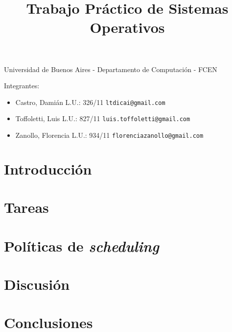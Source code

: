 \documentclass[a4paper,11pt]{article}
\title{Trabajo Práctico de Sistemas Operativos}
\begin{document}
\maketitle

\begin{center}
	Universidad de Buenos Aires - Departamento de Computaci\'on - FCEN
\end{center}

\vspace{2cm}
Integrantes:

\begin{itemize}
	\item Castro, Dami\'an L.U.: 326/11  \verb+ltdicai@gmail.com+
	\item Toffoletti, Luis L.U.: 827/11 \verb+luis.toffoletti@gmail.com+
	\item Zanollo, Florencia L.U.: 934/11 \verb+florenciazanollo@gmail.com+
\end{itemize}

\newpage

\tableofcontents

\newpage

\section{Introducción}



\section{Tareas}

\section{Pol\'iticas de \emph{scheduling}}





\section{Discusi\'on}

\section{Conclusiones}
\end{document}
